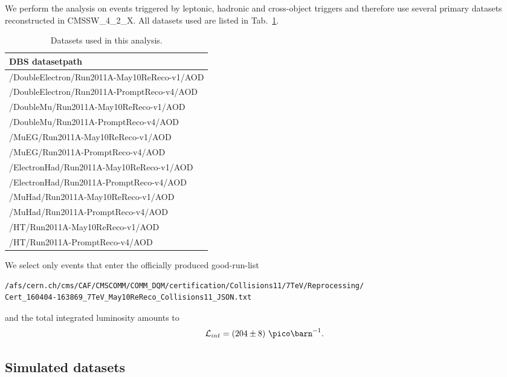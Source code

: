 We perform the analysis on events triggered by leptonic, hadronic
and cross-object triggers
and therefore use several primary datasets
reconstructed in CMSSW\_4\_2\_X.
All datasets used are listed in Tab.~\ref{tab:datadatasets}.
\begin{table}[htdp]
\caption{Datasets used in this analysis.}
\label{tab:datadatasets}
\begin{center}
\begin{tabular}{|l|} \hline
    DBS datasetpath    \\ \hline \hline %
/DoubleElectron/Run2011A-May10ReReco-v1/AOD \\ 
/DoubleElectron/Run2011A-PromptReco-v4/AOD\\
/DoubleMu/Run2011A-May10ReReco-v1/AOD\\ 
/DoubleMu/Run2011A-PromptReco-v4/AOD\\
/MuEG/Run2011A-May10ReReco-v1/AOD\\ 
/MuEG/Run2011A-PromptReco-v4/AOD\\\hline
/ElectronHad/Run2011A-May10ReReco-v1/AOD \\ 
/ElectronHad/Run2011A-PromptReco-v4/AOD \\ 
/MuHad/Run2011A-May10ReReco-v1/AOD \\
/MuHad/Run2011A-PromptReco-v4/AOD\\\hline 
/HT/Run2011A-May10ReReco-v1/AOD \\ 
/HT/Run2011A-PromptReco-v4/AOD \\ \hline 
\end{tabular}
\end{center}
\end{table}

We select only events that enter the officially produced good-run-list
\begin{verbatim}
/afs/cern.ch/cms/CAF/CMSCOMM/COMM_DQM/certification/Collisions11/7TeV/Reprocessing/
Cert_160404-163869_7TeV_May10ReReco_Collisions11_JSON.txt
\end{verbatim}
and the total integrated luminosity amounts to
\begin{equation}
\mathcal{L}_{int} = (204\pm8)~\pbi.
\end{equation}

\subsection{Simulated datasets}

